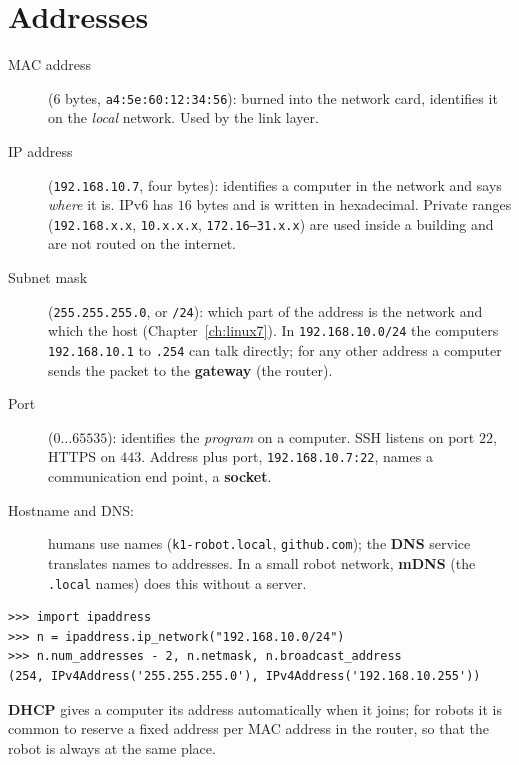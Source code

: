 \section*{Addresses}
\begin{description}
  \item[MAC address] ($6$ bytes, \texttt{a4:5e:60:12:34:56}): burned into the network card, identifies it on the \emph{local} network. Used by the link layer.
  \item[IP address] (\texttt{192.168.10.7}, four bytes): identifies a computer in the network and says \emph{where} it is. IPv6 has $16$ bytes and is written in hexadecimal. Private ranges (\texttt{192.168.x.x}, \texttt{10.x.x.x}, \texttt{172.16--31.x.x}) are used inside a building and are not routed on the internet.
  \item[Subnet mask] (\texttt{255.255.255.0}, or \texttt{/24}): which part of the address is the network and which the host (Chapter~\ref{ch:linux7}). In \texttt{192.168.10.0/24} the computers \texttt{192.168.10.1} to \texttt{.254} can talk directly; for any other address a computer sends the packet to the \textbf{gateway} (the router).
  \item[Port] ($0\dots65535$): identifies the \emph{program} on a computer. SSH listens on port $22$, HTTPS on $443$. Address plus port, \texttt{192.168.10.7:22}, names a communication end point, a \textbf{socket}.
  \item[Hostname and DNS:] humans use names (\texttt{k1-robot.local}, \texttt{github.com}); the \textbf{DNS} service translates names to addresses. In a small robot network, \textbf{mDNS} (the \texttt{.local} names) does this without a server.
\end{description}
\begin{verbatim}
>>> import ipaddress
>>> n = ipaddress.ip_network("192.168.10.0/24")
>>> n.num_addresses - 2, n.netmask, n.broadcast_address
(254, IPv4Address('255.255.255.0'), IPv4Address('192.168.10.255'))
\end{verbatim}
\textbf{DHCP} gives a computer its address automatically when it joins; for robots it is common to reserve a fixed address per MAC address in the router, so that the robot is always at the same place.

